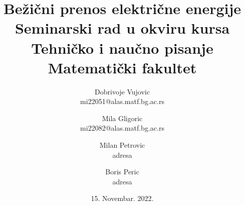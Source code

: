 \documentclass[a4paper]{article}
\begin{document}
	\title{Bežični prenos električne energije\\ \small{Seminarski rad u okviru kursa\\Tehničko i naučno pisanje\\ Matematički fakultet}}
	
	\author{Dobrivoje Vujovic \\mi22051@alas.matf.bg.ac.rs 
			\and Mila Gligoric \\mi22082@alas.matf.bg.ac.rs
			\and Milan Petrovic \\ adresa
			\and Boris Peric\\ adresa}

	\date{15. Novembar. 2022.}
	\maketitle

\tableofcontents
\newpage
\end{document}
